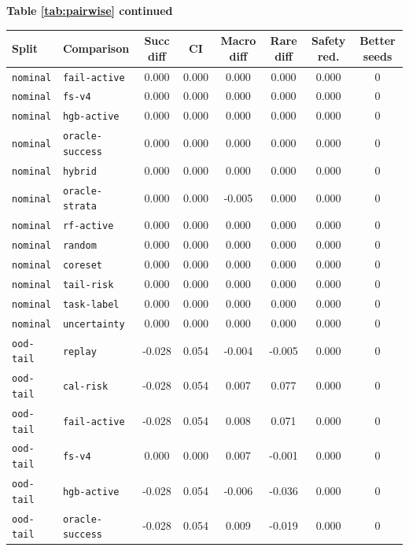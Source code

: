 \documentclass{article}
\begin{document}
\begin{center}
\textbf{Table \ref{tab:pairwise} continued}\\[0.4ex]
\begin{tabular}{llcccccc}
\toprule
Split & Comparison & Succ diff & CI & Macro diff & Rare diff & Safety red. & Better seeds \\
\midrule
\texttt{nominal} & \texttt{fail-active} & 0.000 & 0.000 & 0.000 & 0.000 & 0.000 & 0 \\
\texttt{nominal} & \texttt{fs-v4} & 0.000 & 0.000 & 0.000 & 0.000 & 0.000 & 0 \\
\texttt{nominal} & \texttt{hgb-active} & 0.000 & 0.000 & 0.000 & 0.000 & 0.000 & 0 \\
\texttt{nominal} & \texttt{oracle-success} & 0.000 & 0.000 & 0.000 & 0.000 & 0.000 & 0 \\
\texttt{nominal} & \texttt{hybrid} & 0.000 & 0.000 & 0.000 & 0.000 & 0.000 & 0 \\
\texttt{nominal} & \texttt{oracle-strata} & 0.000 & 0.000 & -0.005 & 0.000 & 0.000 & 0 \\
\texttt{nominal} & \texttt{rf-active} & 0.000 & 0.000 & 0.000 & 0.000 & 0.000 & 0 \\
\texttt{nominal} & \texttt{random} & 0.000 & 0.000 & 0.000 & 0.000 & 0.000 & 0 \\
\texttt{nominal} & \texttt{coreset} & 0.000 & 0.000 & 0.000 & 0.000 & 0.000 & 0 \\
\texttt{nominal} & \texttt{tail-risk} & 0.000 & 0.000 & 0.000 & 0.000 & 0.000 & 0 \\
\texttt{nominal} & \texttt{task-label} & 0.000 & 0.000 & 0.000 & 0.000 & 0.000 & 0 \\
\texttt{nominal} & \texttt{uncertainty} & 0.000 & 0.000 & 0.000 & 0.000 & 0.000 & 0 \\
\texttt{ood-tail} & \texttt{replay} & -0.028 & 0.054 & -0.004 & -0.005 & 0.000 & 0 \\
\texttt{ood-tail} & \texttt{cal-risk} & -0.028 & 0.054 & 0.007 & 0.077 & 0.000 & 0 \\
\texttt{ood-tail} & \texttt{fail-active} & -0.028 & 0.054 & 0.008 & 0.071 & 0.000 & 0 \\
\texttt{ood-tail} & \texttt{fs-v4} & 0.000 & 0.000 & 0.007 & -0.001 & 0.000 & 0 \\
\texttt{ood-tail} & \texttt{hgb-active} & -0.028 & 0.054 & -0.006 & -0.036 & 0.000 & 0 \\
\texttt{ood-tail} & \texttt{oracle-success} & -0.028 & 0.054 & 0.009 & -0.019 & 0.000 & 0 \\

\end{tabular}
\end{center}
\end{document}

